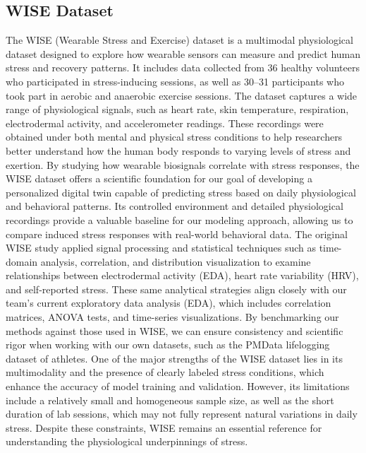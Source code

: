 \documentclass[12pt,letterpaper]{article}
\begin{document}
\subsection{WISE Dataset}
The WISE (Wearable Stress and Exercise) dataset \citep{schlink2020wise} is a multimodal physiological dataset designed to explore how wearable sensors can measure and predict human stress and recovery patterns. It includes data collected from 36 healthy volunteers who participated in stress-inducing sessions, as well as 30–31 participants who took part in aerobic and anaerobic exercise sessions. The dataset captures a wide range of physiological signals, such as heart rate, skin temperature, respiration, electrodermal activity, and accelerometer readings. These recordings were obtained under both mental and physical stress conditions to help researchers better understand how the human body responds to varying levels of stress and exertion. By studying how wearable biosignals correlate with stress responses, the WISE dataset offers a scientific foundation for our goal of developing a personalized digital twin capable of predicting stress based on daily physiological and behavioral patterns. Its controlled environment and detailed physiological recordings provide a valuable baseline for our modeling approach, allowing us to compare induced stress responses with real-world behavioral data. The original WISE study applied signal processing and statistical techniques such as time-domain analysis, correlation, and distribution visualization to examine relationships between electrodermal activity (EDA), heart rate variability (HRV), and self-reported stress. These same analytical strategies align closely with our team’s current exploratory data analysis (EDA), which includes correlation matrices, ANOVA tests, and time-series visualizations. By benchmarking our methods against those used in WISE, we can ensure consistency and scientific rigor when working with our own datasets, such as the PMData lifelogging dataset of athletes. One of the major strengths of the WISE dataset lies in its multimodality and the presence of clearly labeled stress conditions, which enhance the accuracy of model training and validation. However, its limitations include a relatively small and homogeneous sample size, as well as the short duration of lab sessions, which may not fully represent natural variations in daily stress. Despite these constraints, WISE remains an essential reference for understanding the physiological underpinnings of stress.
\end{document}
